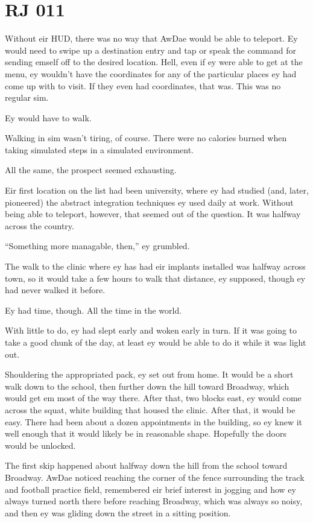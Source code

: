 \chapter*{RJ 011}

Without eir HUD, there was no way that AwDae would be able to teleport. Ey would need to swipe up a destination entry and tap or speak the command for sending emself off to the desired location. Hell, even if ey were able to get at the menu, ey wouldn't have the coordinates for any of the particular places ey had come up with to visit. If they even had coordinates, that was. This was no regular sim.

Ey would have to walk.

Walking in sim wasn't tiring, of course. There were no calories burned when taking simulated steps in a simulated environment.

All the same, the prospect seemed exhausting.

Eir first location on the list had been university, where ey had studied (and, later, pioneered) the abstract integration techniques ey used daily at work. Without being able to teleport, however, that seemed out of the question. It was halfway across the country.

``Something more managable, then,'' ey grumbled.

The walk to the clinic where ey has had eir implants installed was halfway across town, so it would take a few hours to walk that distance, ey supposed, though ey had never walked it before.

Ey had time, though. All the time in the world.

With little to do, ey had slept early and woken early in turn. If it was going to take a good chunk of the day, at least ey would be able to do it while it was light out.

Shouldering the appropriated pack, ey set out from home. It would be a short walk down to the school, then further down the hill toward Broadway, which would get em most of the way there. After that, two blocks east, ey would come across the squat, white building that housed the clinic. After that, it would be easy. There had been about a dozen appointments in the building, so ey knew it well enough that it would likely be in reasonable shape. Hopefully the doors would be unlocked.

The first skip happened about halfway down the hill from the school toward Broadway. AwDae noticed reaching the corner of the fence surrounding the track and football practice field, remembered eir brief interest in jogging and how ey always turned north there before reaching Broadway, which was always so noisy, and then ey was gliding down the street in a sitting position.

